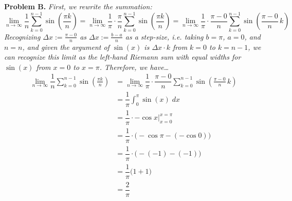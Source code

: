 \documentclass[11pt,letterpaper]{article}
\begin{document}
\newpage



\textbf{Problem B.} {\itshape First, we rewrite the summation:
	\[
	\lim_{n \to \infty} \dfrac{1}{n} \sum_{k=0}^{n-1} \sin \left( \frac{\pi k}{n} \right)= \lim_{n \to \infty} \dfrac{1}{\pi} \cdot \dfrac{\pi}{n} \sum_{k=0}^{n-1} \sin \left( \frac{\pi k}{n} \right)= \lim_{n \to \infty} \dfrac{1}{\pi} \cdot \dfrac{\pi - 0}{n} \sum_{k=0}^{n-1} \sin \left( \frac{\pi - 0}{n} \, k \right)
	\]
Recognizing $\Delta x:= \frac{\pi - 0}{n}$ as $\Delta x:= \frac{b - a}{n}$ as a step-size, i.e. taking $b= \pi$, $a= 0$, and $n= n$, and given the argument of $\sin(x)$ is $\Delta x \cdot k$ from $k= 0$ to $k= n - 1$, we can recognize this limit as the left-hand Riemann sum with equal widths for $\sin(x)$ from $x= 0$ to $x= \pi$. Therefore, we have\dots
	\[
	\begin{aligned}
	\lim_{n \to \infty} \dfrac{1}{n} \sum_{k=0}^{n-1} \sin \left( \frac{\pi k}{n} \right)&= \lim_{n \to \infty} \dfrac{1}{\pi} \cdot \dfrac{\pi - 0}{n} \sum_{k=0}^{n-1} \sin \left( \frac{\pi - 0}{n} \, k \right) \\[0.3cm]
	&=\dfrac{1}{\pi} \int_0^\pi \sin(x) \;dx \\[0.3cm]
	&= \dfrac{1}{\pi} \cdot -\cos x \bigg|_{x=0}^{x= \pi} \\[0.3cm]
	&= \dfrac{1}{\pi} \cdot \bigg( -\cos \pi - (-\cos 0) \bigg) \\[0.3cm]
	&= \dfrac{1}{\pi} \cdot \bigg(-(-1) - (-1) \bigg) \\[0.3cm]
	&= \dfrac{1}{\pi} \bigg(1 + 1 \bigg) \\[0.3cm]
	&= \dfrac{2}{\pi}
	\end{aligned}
	\]
}
\end{document}
